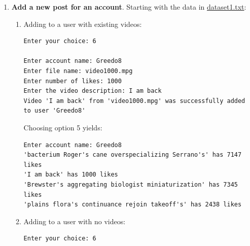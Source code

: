 \documentclass{assignment}
\begin{document}
\begin{enumerate}
\begin{enumerate}
        \item Account is in the tree but has no posts:
        \begin{center} \small { \color{gray}
        \begin{BVerbatim} 
Enter your choice: 5

Enter account name: UlicQel-Droma6
User 'UlicQel-Droma6' has no videos
        \end{BVerbatim} 
        } \end{center} \color{black}
        
        \item Account is not in the tree:
        \begin{center} \small { \color{gray}
        \begin{BVerbatim} 
Enter your choice: 5

Enter account name: Greedo10
User 'Greedo10' does not exist
        \end{BVerbatim} 
        } \end{center} \color{black}
    \end{enumerate}

\item \textbf{Add a new post for an account}. Starting with the data in \underline{dataset1.txt}:
\begin{enumerate}
    \item Adding to a user with existing videos:
    \begin{center} \small { \color{gray}
\begin{BVerbatim} 
Enter your choice: 6

Enter account name: Greedo8
Enter file name: video1000.mpg
Enter number of likes: 1000
Enter the video description: I am back
Video 'I am back' from 'video1000.mpg' was successfully added to user 'Greedo8'
\end{BVerbatim} 
} \end{center} \color{black}
Choosing option 5 yields:
\begin{center} 
\small{
\color{gray}
\begin{BVerbatim} 
Enter account name: Greedo8
'bacterium Roger's cane overspecializing Serrano's' has 7147 likes
'I am back' has 1000 likes
'Brewster's aggregating biologist miniaturization' has 7345 likes
'plains flora's continuance rejoin takeoff's' has 2438 likes
\end{BVerbatim} 
} \end{center} \color{black}


    \item Adding to a user with no videos:
    \begin{center} \small { \color{gray}
\begin{BVerbatim} 
Enter your choice: 6


\end{BVerbatim}}
\end{center}
\end{enumerate}
\end{enumerate}
\end{document}
